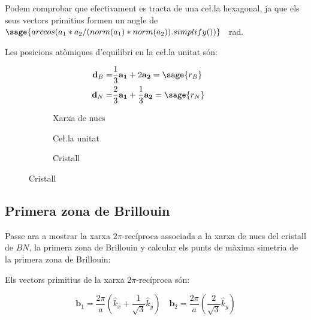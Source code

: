 \documentclass[12pt]{article} %
\let\vec\mathbf %
\begin{document}
{Podem comprobar que efectivament es tracta de una ce\l.la hexagonal, ja que els seus vectors primitius formen un angle de $\sage{arccos(a_1*a_2/(norm(a_1)*norm(a_2)).simplify())}$ \SI{}{\radian}.

Les posicions atòmiques d'equilibri en la ce\l.la unitat són:

\begin{equation}\begin{split}
\vec d_B=&\frac{1}{3}\vec{a_1}+2\vec{a_2}=\sage{r_B}\qquad\\
\vec d_N=&\frac{2}{3}\vec{a_1}+\frac{1}{3}\vec{a_2}=\sage{r_N} 
\end{split}\end{equation} 


\begin{figure}[h]
\centering
\begin{subfigure}[b]{0.3\textwidth}
\centering
{}
\caption{Xarxa de nucs}
\end{subfigure}
\begin{subfigure}[b]{0.3\textwidth}
\centering
{}
\caption{Ce\l.la unitat}
\end{subfigure}
\begin{subfigure}[b]{0.3\textwidth}
\centering
{}
\caption{Cristall}
\end{subfigure}
\end{figure}



\subsection{Primera zona de Brillouin}
Passe ara a mostrar la xarxa $2\pi$-recíproca associada a la xarxa de nucs del cristall de $BN$, la primera zona de Brillouin y calcular els punts de màxima simetria de la primera zona de Brillouin:

Els vectors primitius de la xarxa $2\pi\text{-recíproca}$ són:

\begin{equation}
\label{eq:11}
\vec b_1=\frac{2\pi}{a}\left(\hat k_{x}+\frac{1}{\sqrt{3}}\hat k_{y}\right)\quad \vec b_2=\frac{2\pi}{a}\left(\frac{2}{\sqrt{3}}\hat k_y\right)
\end{equation} 

}
\end{document}
